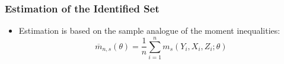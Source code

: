\documentclass[notes=show]{beamer}
\begin{document}
\begin{frame}[label=estset] 
\frametitle{Estimation of the Identified Set}

\begin{itemize}
\item Estimation is based on the sample analogue of the moment inequalities:
\begin{equation*}
\overline{m}_{n,s}(\theta)=\frac{1}{n}\sum_{i=1}^{n}m_{s}(Y_{i},X_{i},Z_{i};%
\theta)
\end{equation*}
\begin{figure}[h!]
\begin{center}
\end{center}
\end{figure}
\end{itemize}

\end{frame}

\end{document}
